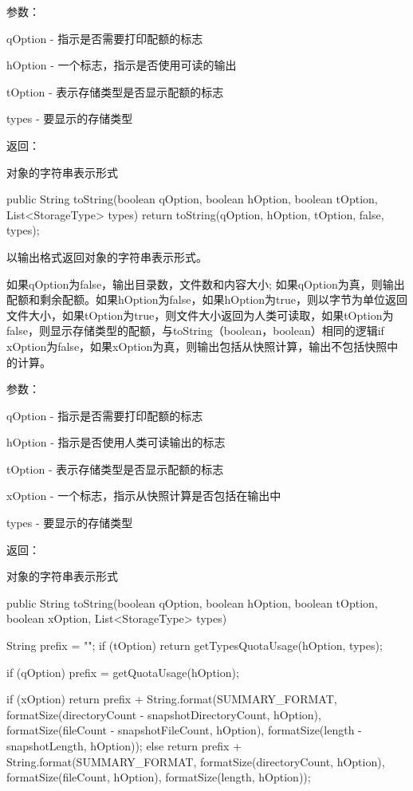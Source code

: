 参数：

qOption - 指示是否需要打印配额的标志

hOption - 一个标志，指示是否使用可读的输出

tOption - 表示存储类型是否显示配额的标志

types - 要显示的存储类型

返回：

对象的字符串表示形式

\begin{java}
public String toString(boolean qOption, boolean hOption, boolean tOption, List<StorageType> types) {
  return toString(qOption, hOption, tOption, false, types);
}
\end{java}
以输出格式返回对象的字符串表示形式。

如果qOption为false，输出目录数，文件数和内容大小; 如果qOption为真，则输出配额和剩余配额。如果hOption为false，如果hOption为true，则以字节为单位返回文件大小，如果tOption为true，则文件大小返回为人类可读取，如果tOption为false，则显示存储类型的配额，与toString（boolean，boolean）相同的逻辑if xOption为false，如果xOption为真，则输出包括从快照计算，输出不包括快照中的计算。

参数：

qOption - 指示是否需要打印配额的标志

hOption - 指示是否使用人类可读输出的标志

tOption - 表示存储类型是否显示配额的标志

xOption - 一个标志，指示从快照计算是否包括在输出中

types - 要显示的存储类型

返回：

对象的字符串表示形式

\begin{java}
public String toString(boolean qOption, boolean hOption, boolean tOption,
    boolean xOption, List<StorageType> types) {
  String prefix = "";
  if (tOption) {
    return getTypesQuotaUsage(hOption, types);
  }

  if (qOption) {
    prefix = getQuotaUsage(hOption);
  }

  if (xOption) {
    return prefix + String.format(SUMMARY_FORMAT,
        formatSize(directoryCount - snapshotDirectoryCount, hOption),
        formatSize(fileCount - snapshotFileCount, hOption),
        formatSize(length - snapshotLength, hOption));
  } else {
    return prefix + String.format(SUMMARY_FORMAT,
        formatSize(directoryCount, hOption),
        formatSize(fileCount, hOption),
        formatSize(length, hOption));
  }
}
\end{java}
